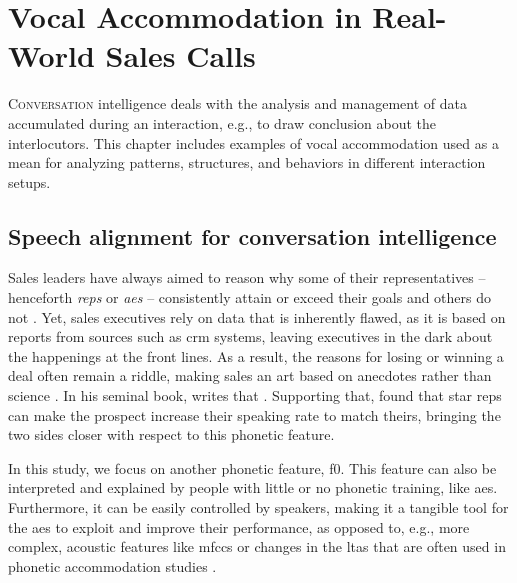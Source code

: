 \chapter{Vocal Accommodation in Real-World Sales Calls}
\label{chap:conv_analysis}

\lettrine{C}{onversation} intelligence deals with the analysis and management of data accumulated during an interaction, e.g., to draw conclusion about the interlocutors.
This chapter includes examples of vocal accommodation used as a mean for analyzing patterns, structures, and behaviors in different interaction setups.

\pagebreak

\section{Speech alignment for conversation intelligence}
\label{sec:conversation_intelligence}


Sales leaders have always aimed to reason why some of their representatives -- henceforth \emph{reps} or \emph{\acp{ae}} -- consistently attain or exceed their goals and others do not \citep{Kovac2017its}.
Yet, sales executives rely on data that is inherently flawed, as it is based on reports from sources such as \ac{crm} systems, leaving executives in the dark about the happenings at the front lines.
As a result, the reasons for losing or winning a deal often remain a riddle, making sales an art based on anecdotes rather than science \citep{Yohn2016best, Martin2017six}.
In his seminal book, \citet{Gladwell2006tipping} writes that .
Supporting that, \citet{Orlob2018nine} found that star reps can make the prospect increase their speaking rate to match theirs, bringing the two sides closer with respect to this phonetic feature.

In this study, we focus on another phonetic feature, \ac{f0}.
This feature can also be interpreted and explained by people with little or no phonetic training, like \acp{ae}.
Furthermore, it can be easily controlled by speakers, making it a tangible tool for the \acp{ae} to exploit and improve their performance, as opposed to, e.g., more complex, acoustic features like \acp{mfcc} or changes in the \ac{ltas} that are often used in phonetic accommodation studies \citep{Levitan2011measuring,Borrie2019syncing}.

